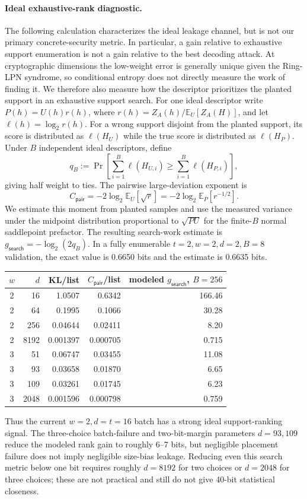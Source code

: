 \paragraph{Ideal exhaustive-rank diagnostic.}
The following calculation characterizes the ideal leakage channel, but is not
our primary concrete-security metric.  In particular, a gain relative to
exhaustive support enumeration is not a gain relative to the best decoding
attack.
At cryptographic dimensions the low-weight error is generally unique given
the Ring-LPN syndrome, so conditional entropy does not directly measure the
work of finding it.  We therefore also measure how the descriptor prioritizes
the planted support in an exhaustive support search.  For one ideal descriptor
write $P(h)=U(h)r(h)$, where
$r(h)=Z_A(h)/\mathbb E_U[Z_A(H)]$, and let
$\ell(h)=\log_2 r(h)$.  For a wrong support disjoint from the planted support,
its score is distributed as $\ell(H_U)$ while the true score is distributed as
$\ell(H_P)$.  Under $B$ independent ideal descriptors, define
\[
 q_B:=\Pr\left[\sum_{i=1}^B\ell(H_{U,i})
             \mathrel{\geq}\sum_{i=1}^B\ell(H_{P,i})\right],
\]
giving half weight to ties.  The pairwise large-deviation exponent is
\[
 C_{\mathsf{pair}}
 =-2\log_2\mathbb E_U[\sqrt r]
 =-2\log_2\mathbb E_P[r^{-1/2}].
\]
We estimate this moment from planted samples and use the measured variance
under the midpoint distribution proportional to $\sqrt{PU}$ for the finite-$B$
normal saddlepoint prefactor.  The resulting search-work estimate is
$g_{\mathsf{search}}=-\log_2(2q_B)$.  In a fully enumerable
$t=2,w=2,d=2,B=8$ validation, the exact value is 0.6650 bits and the estimate
is 0.6635 bits.

\begin{center}
\begin{tabular}{c|r|r|r|r}
 $w$ & $d$ & KL/list & $C_{\mathsf{pair}}$/list
     & modeled $g_{\mathsf{search}}$, $B=256$ \\ \hline
 2 & 16   & 1.0507   & 0.6342   & 166.46 \\
 2 & 64   & 0.1995   & 0.1066   & 30.28 \\
 2 & 256  & 0.04644  & 0.02411  & 8.20 \\
 2 & 8192 & 0.001397 & 0.000705 & 0.715 \\
 3 & 51   & 0.06747  & 0.03455  & 11.08 \\
 3 & 93   & 0.03658  & 0.01870  & 6.65 \\
 3 & 109  & 0.03261  & 0.01745  & 6.23 \\
 3 & 2048 & 0.001596 & 0.000798 & 0.759
\end{tabular}
\end{center}
Thus the current $w=2,d=t=16$ batch has a strong ideal support-ranking signal.
The three-choice batch-failure and two-bit-margin parameters $d=93,109$ reduce
the modeled rank gain to roughly 6--7 bits, but negligible placement failure does
not imply negligible size-bias leakage.  Reducing even this search metric below
one bit requires roughly $d=8192$ for two choices or $d=2048$ for three choices;
these are not practical and still do not give 40-bit statistical closeness.

